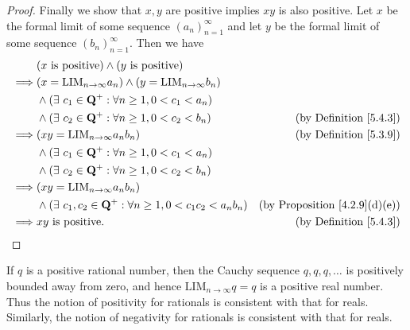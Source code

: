\begin{proof}
    Finally we show that \(x, y\) are positive implies \(xy\) is also positive.
    Let \(x\) be the formal limit of some sequence \((a_n)_{n = 1}^{\infty}\) and let \(y\) be the formal limit of some sequence \((b_n)_{n = 1}^{\infty}\).
    Then we have
    \begin{align*}
                 & (x \text{ is positive}) \land (y \text{ is positive})                                                                            \\
        \implies & (x = \text{LIM}_{n \to \infty} a_n) \land (y = \text{LIM}_{n \to \infty} b_n)                                                    \\
                 & \land (\exists\ c_1 \in \mathbf{Q}^+ : \forall n \geq 1, 0 < c_1 < a_n)                                                          \\
                 & \land (\exists\ c_2 \in \mathbf{Q}^+ : \forall n \geq 1, 0 < c_2 < b_n)              & \text{(by Definition \ref{5.4.3})}        \\
        \implies & (xy = \text{LIM}_{n \to \infty} a_n b_n)                                             & \text{(by Definition \ref{5.3.9})}        \\
                 & \land (\exists\ c_1 \in \mathbf{Q}^+ : \forall n \geq 1, 0 < c_1 < a_n)                                                          \\
                 & \land (\exists\ c_2 \in \mathbf{Q}^+ : \forall n \geq 1, 0 < c_2 < b_n)                                                          \\
        \implies & (xy = \text{LIM}_{n \to \infty} a_n b_n)                                                                                         \\
                 & \land (\exists\ c_1, c_2 \in \mathbf{Q}^+ : \forall n \geq 1, 0 < c_1 c_2 < a_n b_n) & \text{(by Proposition \ref{4.2.9}(d)(e))} \\
        \implies & xy \text{ is positive}.                                                              & \text{(by Definition \ref{5.4.3})}
    \end{align*}
\end{proof}

\begin{note}
    If \(q\) is a positive rational number, then the Cauchy sequence \(q, q, q, \dots\) is positively bounded away from zero, and hence \(\text{LIM}_{n \to \infty} q = q\) is a positive real number.
    Thus the notion of positivity for rationals is consistent with that for reals.
    Similarly, the notion of negativity for rationals is consistent with that for reals.
\end{note}


